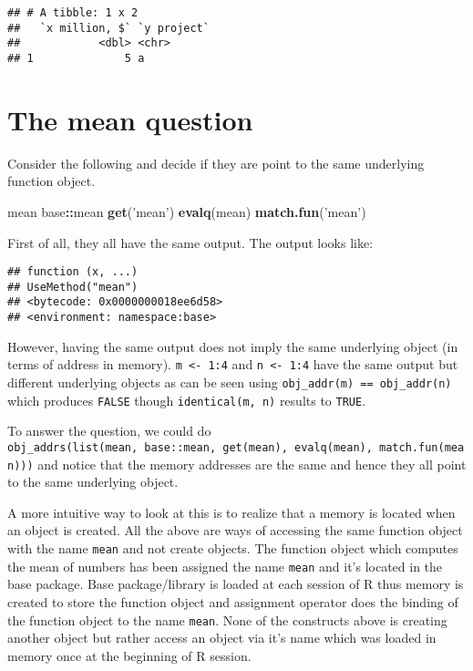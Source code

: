 \documentclass[]{book}
\newenvironment{Shaded}{\begin{snugshade}}{\end{snugshade}}
\newcommand{\KeywordTok}[1]{\textcolor[rgb]{0.13,0.29,0.53}{\textbf{#1}}}
\newcommand{\NormalTok}[1]{#1}
\newcommand{\OperatorTok}[1]{\textcolor[rgb]{0.81,0.36,0.00}{\textbf{#1}}}
\newcommand{\StringTok}[1]{\textcolor[rgb]{0.31,0.60,0.02}{#1}}
\begin{document}
\begin{verbatim}
## # A tibble: 1 x 2
##   `x million, $` `y project`
##            <dbl> <chr>      
## 1              5 a
\end{verbatim}

\hypertarget{the-mean-question}{%
\section{The mean question}\label{the-mean-question}}

Consider the following and decide if they are point to the same underlying function object.

\begin{Shaded}
\begin{Highlighting}[]
\NormalTok{mean}
\NormalTok{base}\OperatorTok{::}\NormalTok{mean}
\KeywordTok{get}\NormalTok{(}\StringTok{'mean'}\NormalTok{)}
\KeywordTok{evalq}\NormalTok{(mean)}
\KeywordTok{match.fun}\NormalTok{(}\StringTok{'mean'}\NormalTok{)}
\end{Highlighting}
\end{Shaded}

First of all, they all have the same output. The output looks like:

\begin{verbatim}
## function (x, ...) 
## UseMethod("mean")
## <bytecode: 0x0000000018ee6d58>
## <environment: namespace:base>
\end{verbatim}

However, having the same output does not imply the same underlying object (in terms of address in memory). \texttt{m\ \textless{}-\ 1:4} and \texttt{n\ \textless{}-\ 1:4} have the same output but different underlying objects as can be seen using \texttt{obj\_addr(m)\ ==\ obj\_addr(n)} which produces \texttt{FALSE} though \texttt{identical(m,\ n)} results to \texttt{TRUE}.

To answer the question, we could do \texttt{obj\_addrs(list(mean,\ base::mean,\ get(\textquotesingle{}mean\textquotesingle{}),\ evalq(mean),\ match.fun(\textquotesingle{}mean\textquotesingle{})))} and notice that the memory addresses are the same and hence they all point to the same underlying object.

A more intuitive way to look at this is to realize that a memory is located when an object is created. All the above are ways of accessing the same function object with the name \texttt{mean} and not create objects. The function object which computes the mean of numbers has been assigned the name \texttt{mean} and it's located in the base package. Base package/library is loaded at each session of R thus memory is created to store the function object and assignment operator does the binding of the function object to the name \texttt{mean}. None of the constructs above is creating another object but rather access an object via it's name which was loaded in memory once at the beginning of R session.
\end{document}
